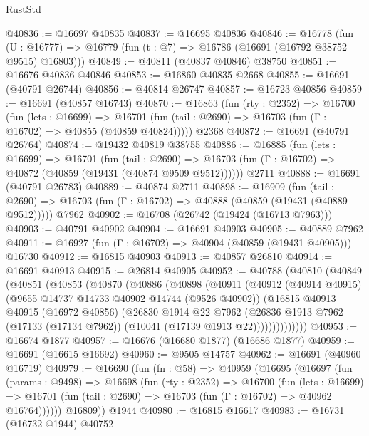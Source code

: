 \begin{lexlean}{RustStd}
\begin{coremodule}
@40836 := @16697 @40835
@40837 := @16695 @40836
@40846 := @16778
    (fun (U : @16777) => @16779 (fun (t : @7) => @16786 (@16691 (@16792 @38752 @9515) @16803)))
@40849 := @40811 (@40837 @40846) @38750
@40851 := @16676 @40836 @40846
@40853 := @16860 @40835 @2668
@40855 := @16691 (@40791 @26744)
@40856 := @40814 @26747
@40857 := @16723 @40856
@40859 := @16691 (@40857 @16743)
@40870 := @16863
    (fun (rty : @2352) =>
    @16700
      (fun (lets : @16699) =>
      @16701 (fun (tail : @2690) => @16703 (fun (Γ : @16702) => @40855 (@40859 @40824)))))
    @2368
@40872 := @16691 (@40791 @26764)
@40874 := @19432 @40819 @38755
@40886 := @16885
    (fun (lets : @16699) =>
    @16701
      (fun (tail : @2690) =>
      @16703 (fun (Γ : @16702) => @40872 (@40859 (@19431 (@40874 @9509 @9512))))))
    @2711
@40888 := @16691 (@40791 @26783)
@40889 := @40874 @2711
@40898 := @16909
    (fun (tail : @2690) => @16703 (fun (Γ : @16702) => @40888 (@40859 (@19431 (@40889 @9512)))))
    @7962
@40902 := @16708 (@26742 (@19424 (@16713 @7963)))
@40903 := @40791 @40902
@40904 := @16691 @40903
@40905 := @40889 @7962
@40911 := @16927 (fun (Γ : @16702) => @40904 (@40859 (@19431 @40905))) @16730
@40912 := @16815 @40903
@40913 := @40857 @26810
@40914 := @16691 @40913
@40915 := @26814 @40905
@40952 := @40788
    (@40810
      (@40849
        (@40851
          (@40853
            (@40870
              (@40886
                (@40898
                  (@40911
                    (@40912
                      (@40914 @40915)
                      (@9655 @14737 @14733 @40902 @14744 (@9526 @40902))
                      (@16815
                        @40913
                        @40915
                        (@16972 @40856)
                        (@26830
                          @1914
                          @22
                          @7962
                          (@26836
                            @1913
                            @7962
                            (@17133 (@17134 @7962))
                            (@10041 (@17139 @1913 @22))))))))))))))
@40953 := @16674 @1877
@40957 := @16676 (@16680 @1877) (@16686 @1877)
@40959 := @16691 (@16615 @16692)
@40960 := @9505 @14757
@40962 := @16691 (@40960 @16719)
@40979 := @16690
    (fun (fn : @58) =>
    @40959
      (@16695
        (@16697
          (fun (params : @9498) =>
          @16698
            (fun (rty : @2352) =>
            @16700
              (fun (lets : @16699) =>
              @16701 (fun (tail : @2690) => @16703 (fun (Γ : @16702) => @40962 @16764))))))
        @16809))
    @1944
@40980 := @16815 @16617
@40983 := @16731 (@16732 @1944) @40752

\end{coremodule}
\end{lexlean}
